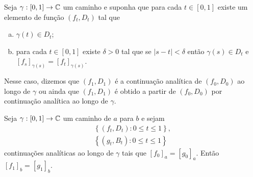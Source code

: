     \begin{definicao}
    \label{def-continuacao-analitica}
        Seja $\gamma: [0,1] \to \mathbb{C}$ um caminho e suponha que para cada
        $t\in[0,1]$ existe um elemento de função $(f_t, D_t)$ tal que
        \begin{enumerate}[(a)]
            \item $\gamma(t) \in D_t$;
            \item para cada $t\in[0,1]$ existe $\delta > 0$ tal que se $|s-t| < \delta$
            então $\gamma(s) \in D_t$ e $[f_s]_{\gamma(s)} = [f_t]_{\gamma(s)}$.
        \end{enumerate}
        Nesse caso, dizemos que $(f_1, D_1)$ é a continuação analítica de $(f_0,D_0)$ ao 
        longo de $\gamma$ ou ainda que $(f_1, D_1)$ é obtido a partir de $(f_0,D_0)$ por
        continuação analítica ao longo de $\gamma$.
    \end{definicao}


    \begin{proposicao}
    \label{prop-unicidade-continuacao-analitica-caminho}
        Seja $\gamma: [0,1]\to\mathbb{C}$ um caminho de $a$ para $b$ e sejam
        \begin{align*}
            \left\{ (f_t, D_t): 0\leq t\leq 1 \right\}, \\
            \left\{ (g_t, B_t): 0\leq t\leq 1 \right\}
        \end{align*}
        continuações analíticas ao longo de $\gamma$ tais que $[f_0]_a = [g_0]_a$.
        Então $[f_1]_b = [g_1]_b$.
    \end{proposicao}

